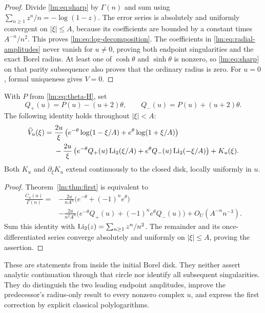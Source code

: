 \begin{proof}
Divide \eqref{lm:eq:sharp} by $\Gamma(n)$ and sum using
$\sum_{n\geq1}z^n/n=-\log(1-z)$.  The error series is absolutely
and uniformly convergent on $|\xi|\leq A$, because its coefficients
are bounded by a constant times $A^{-n}/n^2$.  This proves
\eqref{lm:eq:log-decomposition}.  The coefficients in
\eqref{lm:eq:radial-amplitudes} never vanish for $u\ne0$, proving
both endpoint singularities and the exact Borel radius.  At least one
of $\cosh\theta$ and $\sinh\theta$ is nonzero, so
\eqref{lm:eq:sharp} on that parity subsequence also proves that the
ordinary radius is zero.  For $u=0$, formal uniqueness gives $V=0$.
\end{proof}

\begin{corollary}
\label{lm:cor:dilog}
With $P$ from \eqref{lm:eq:theta-H}, set
\begin{equation}\label{lm:eq:Q}
 Q_+(u)=P(u)-(u+2)\theta,\qquad
 Q_-(u)=P(u)+(u+2)\theta.
\end{equation}
The following identity holds throughout $|\xi|<A$:
\begin{align}
 \widehat V_u(\xi)={}&\frac{2u}{\xi}
       \left(e^{-\theta}\log(1-\xi/A)
                         +e^{\theta}\log(1+\xi/A)\right)\notag\\
 &-\frac{2u}{\xi}
       \left(e^{-\theta}Q_+(u)\operatorname{Li}_2(\xi/A)
                         +e^{\theta}Q_-(u)\operatorname{Li}_2(-\xi/A)\right)
       +K_u(\xi).\label{lm:eq:dilog-decomposition}
\end{align}
Both $K_u$ and $\partial_\xi K_u$ extend continuously to the closed
disk, locally uniformly in $u$.
\end{corollary}

\begin{proof}
Theorem~\ref{lm:thm:first} is equivalent to
\begin{align*}
 \frac{C_n(u)}{\Gamma(n)}
 ={}&-\frac{2u}{nA^n}\bigl(e^{-\theta}+(-1)^ne^{\theta}\bigr)\\
 &-\frac{2u}{n^2A^n}
       \bigl(e^{-\theta}Q_+(u)+(-1)^ne^{\theta}Q_-(u)\bigr)
       +O_U(A^{-n}n^{-3}).
\end{align*}
Sum this identity with $\operatorname{Li}_2(z)=\sum_{n\geq1}z^n/n^2$.
The remainder and its once-differentiated series converge absolutely
and uniformly on $|\xi|\leq A$, proving the assertion.
\end{proof}

These are statements from inside the initial Borel disk.  They neither
assert analytic continuation through that circle nor identify all
subsequent singularities.  They do distinguish the two leading endpoint
amplitudes, improve the predecessor's radius-only result to every
nonzero complex $u$, and express the first correction by explicit
classical polylogarithms.
